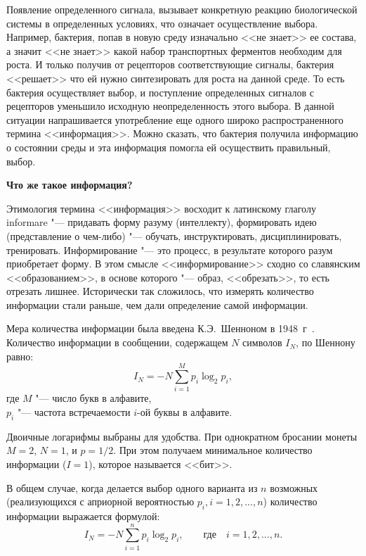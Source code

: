 \documentclass[12pt,a4paper,oneside]{book}
\begin{document}
Появление определенного сигнала, вызывает конкретную реакцию биологической системы в определенных условиях, что означает осуществление выбора. Например, бактерия, попав в новую среду изначально <<не знает>> ее состава, а значит <<не знает>> какой набор транспортных ферментов необходим для роста. И только получив от рецепторов соответствующие сигналы, бактерия <<решает>> что ей нужно синтезировать для роста на данной среде. То есть бактерия осуществляет выбор, и поступление определенных сигналов с рецепторов уменьшило исходную неопределенность этого выбора. В данной ситуации напрашивается употребление еще одного широко распространенного термина <<информация>>. Можно сказать, что бактерия получила информацию о состоянии среды и эта информация помогла ей осуществить правильный, выбор.

{\bf Что же такое информация?}

Этимология термина <<информация>> восходит к латинскому глаголу informare "--- придавать форму разуму (интеллекту), формировать идею (представление о чем-либо) "--- обучать, инструктировать, дисциплинировать, тренировать. Информирование "--- это процесс, в результате которого разум приобретает форму. В этом смысле <<информирование>> сходно со славянским <<образованием>>, в основе которого "--- образ, <<обрезать>>, то есть отрезать лишнее. 
Исторически так сложилось, что измерять количество информации стали раньше, чем дали определение самой информации. 

Мера количества информации была введена К.Э.~Шенноном в 1948~г~\cite{Shannon1948}. Количество информации в сообщении, содержащем $N$ символов $I_N$, по Шеннону равно:
\begin{equation}
	\label{infoShen}
	I_N = -N \sum_{i=1}^M p_i \log_2 p_i,
\end{equation}
где $M$ "--- число букв в алфавите,\\
$p_i$ "--- частота встречаемости $i$-ой буквы в алфавите.

Двоичные логарифмы выбраны для удобства. При однократном бросании монеты $M = 2$, $N = 1$, и $p = 1 / 2$. При этом получаем минимальное количество информации ($I = 1$), которое называется <<бит>>.

В общем случае, когда делается выбор одного варианта из $n$ возможных (реализующихся с априорной вероятностью $p_i, i = 1, 2, ..., n$) количество информации выражается формулой:
\begin{equation}
	\label{infoShen2}
	I_N = -N \sum_{i=1}^n p_i \log_2 p_i, \qquad \text{где} \quad i = 1, 2, ..., n.
\end{equation}
\end{document}
